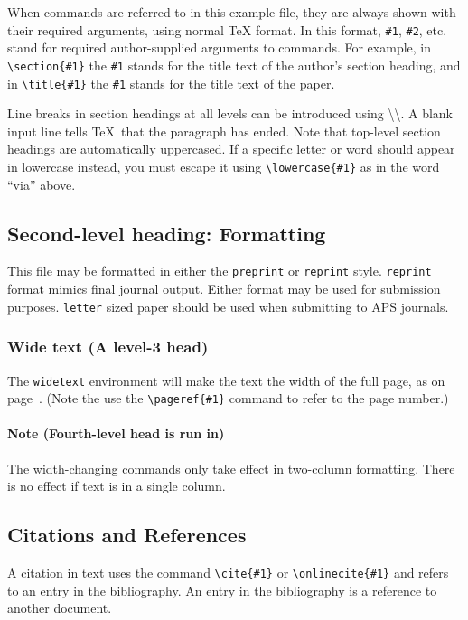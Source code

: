 \documentclass[%
 reprint,
 amsmath,amssymb,
 aps,
]{revtex4-2}
\begin{document}
  When commands are referred to in this example file, they are always
  shown with their required arguments, using normal \TeX{} format. In
  this format, \verb+#1+, \verb+#2+, etc. stand for required
  author-supplied arguments to commands. For example, in
  \verb+\section{#1}+ the \verb+#1+ stands for the title text of the
  author's section heading, and in \verb+\title{#1}+ the \verb+#1+
  stands for the title text of the paper.

  Line breaks in section headings at all levels can be introduced using
  \textbackslash\textbackslash. A blank input line tells \TeX\ that the
  paragraph has ended. Note that top-level section headings are
  automatically uppercased. If a specific letter or word should appear in
  lowercase instead, you must escape it using \verb+\lowercase{#1}+ as
  in the word ``via'' above.

  \subsection{\label{sec:level2}Second-level heading: Formatting}

  This file may be formatted in either the \texttt{preprint} or
  \texttt{reprint} style. \texttt{reprint} format mimics final journal output. 
  Either format may be used for submission purposes. \texttt{letter} sized paper should
  be used when submitting to APS journals.

  \subsubsection{Wide text (A level-3 head)}
  The \texttt{widetext} environment will make the text the width of the
  full page, as on page~\pageref{eq:wideeq}. (Note the use the
  \verb+\pageref{#1}+ command to refer to the page number.) 
  \paragraph{Note (Fourth-level head is run in)}
  The width-changing commands only take effect in two-column formatting. 
  There is no effect if text is in a single column.

  \subsection{\label{sec:citeref}Citations and References}
  A citation in text uses the command \verb+\cite{#1}+ or
  \verb+\onlinecite{#1}+ and refers to an entry in the bibliography. 
  An entry in the bibliography is a reference to another document.
\end{document}
